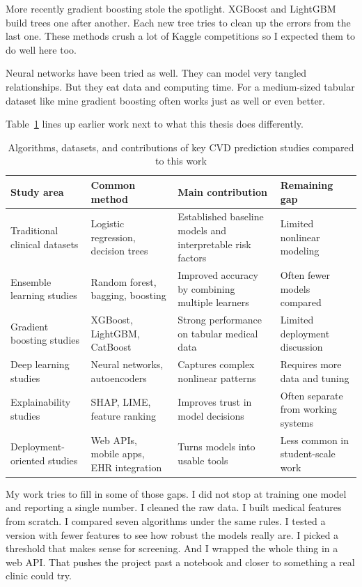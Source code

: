 \documentclass[12pt, a4paper, oneside]{book}
\begin{document}
More recently gradient boosting stole the spotlight. XGBoost and LightGBM build trees one after another. Each new tree tries to clean up the errors from the last one. These methods crush a lot of Kaggle competitions so I expected them to do well here too.

Neural networks have been tried as well. They can model very tangled relationships. But they eat data and computing time. For a medium-sized tabular dataset like mine gradient boosting often works just as well or even better.

Table~\ref{tab:related_work} lines up earlier work next to what this thesis does differently.

\begin{table}[H]
\centering
\caption{Algorithms, datasets, and contributions of key CVD prediction studies compared to this work}
\label{tab:related_work}
\small
{}
\renewcommand{\arraystretch}{1.15}
\begin{tabular}{p{} p{} p{} p{}}
\toprule
\textbf{Study area} & \textbf{Common method} & \textbf{Main contribution} & \textbf{Remaining gap} \\
\midrule
Traditional clinical datasets & Logistic regression, decision trees & Established baseline models and interpretable risk factors & Limited nonlinear modeling \\
Ensemble learning studies & Random forest, bagging, boosting & Improved accuracy by combining multiple learners & Often fewer models compared \\
Gradient boosting studies & XGBoost, LightGBM, CatBoost & Strong performance on tabular medical data & Limited deployment discussion \\
Deep learning studies & Neural networks, autoencoders & Captures complex nonlinear patterns & Requires more data and tuning \\
Explainability studies & SHAP, LIME, feature ranking & Improves trust in model decisions & Often separate from working systems \\
Deployment-oriented studies & Web APIs, mobile apps, EHR integration & Turns models into usable tools & Less common in student-scale work \\
\bottomrule
\end{tabular}
\end{table}

My work tries to fill in some of those gaps. I did not stop at training one model and reporting a single number. I cleaned the raw data. I built medical features from scratch. I compared seven algorithms under the same rules. I tested a version with fewer features to see how robust the models really are. I picked a threshold that makes sense for screening. And I wrapped the whole thing in a web API. That pushes the project past a notebook and closer to something a real clinic could try.
\end{document}
